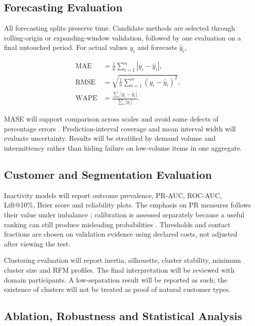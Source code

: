 \subsection{Forecasting Evaluation}

All forecasting splits preserve time. Candidate methods are selected through
rolling-origin or expanding-window validation, followed by one evaluation on a
final untouched period. For actual values $y_i$ and forecasts $\hat y_i$,

\begin{align}
\mathrm{MAE} &= \frac{1}{n}\sum_{i=1}^{n}|y_i-\hat y_i|,\\
\mathrm{RMSE} &= \sqrt{\frac{1}{n}\sum_{i=1}^{n}(y_i-\hat y_i)^2},\\
\mathrm{WAPE} &= \frac{\sum_i|y_i-\hat y_i|}{\sum_i|y_i|}.
\end{align}

MASE will support comparison across scales and avoid some defects of percentage
errors \cite{hyndman2006accuracy}. Prediction-interval coverage and mean
interval width will evaluate uncertainty.
Results will be stratified by demand volume and intermittency rather than hiding
failure on low-volume items in one aggregate.

\subsection{Customer and Segmentation Evaluation}

Inactivity models will report outcome prevalence, PR-AUC, ROC-AUC, Lift@10\%,
Brier score and reliability plots. The emphasis on PR measures follows their
value under imbalance \cite{saito2015pr}; calibration is assessed separately
because a useful ranking can still produce misleading probabilities
\cite{niculescu2005calibration}. Thresholds and contact fractions are chosen on
validation evidence using declared costs, not adjusted after viewing the test.

Clustering evaluation will report inertia, silhouette, cluster stability,
minimum cluster size and RFM profiles. The final interpretation will be reviewed
with domain participants. A low-separation result will be reported as such; the
existence of clusters will not be treated as proof of natural customer types.

\subsection{Ablation, Robustness and Statistical Analysis}

